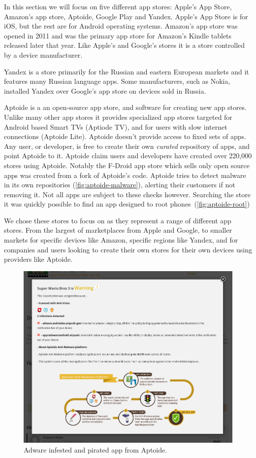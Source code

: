\documentclass[thesis.tex]{subfiles}
\begin{document}
In this section we will focus on five different app stores: Apple's App Store,
Amazon's app store, Aptoide, Google Play and Yandex. Apple's App Store is for
iOS, but the rest are for Android operating systems. Amazon's app store was
opened in 2011 and was the primary app store for Amazon's Kindle tablets
released later that year. Like Apple's and Google's stores it is a store
controlled by a device manufacturer.

Yandex is a store primarily for the Russian and eastern European markets and it
features many Russian language apps. Some manufacturers, such as Nokia,
installed Yandex over Google's app store on devices sold in Russia.

Aptoide is a an open-source app store, and software for creating new app stores.
Unlike many other app stores it provides specialized app stores targeted for
Android based Smart TVs (Aptiode TV), and for users with slow internet
connections (Aptoide Lite). Aptoide doesn't provide access to fixed sets of
apps. Any user, or developer, is free to create their own \emph{curated}
repository of apps, and point Aptoide to it. Aptoide claim users and developers
have created over 220,000 stores using Aptoide. Notably the F-Droid app store
which sells only open source apps was created from a fork of Aptoide's code.
Aptoide tries to detect malware in its own repositories
(\autoref{fig:aptoide-malware}), alerting their customers if not removing it.
Not all apps are subject to these checks however. Searching the store it was
quickly possible to find an app designed to root
phones~(\autoref{fig:aptoide-root})

We chose these stores to focus on as they represent a range of different app
stores. From the largest of marketplaces from Apple and Google, to smaller
markets for specific devices like Amazon, specific regions like Yandex, and for
companies and users looking to create their own stores for their own devices
using providers like Aptoide.

\begin{figure}
  \centering
  \includegraphics[width=0.8\linewidth]{figures/aptoide-malware.png}
  \caption{Adware infested and pirated app from Aptoide.}
  \label{fig:aptoide-malware}
\end{figure}
\end{document}
